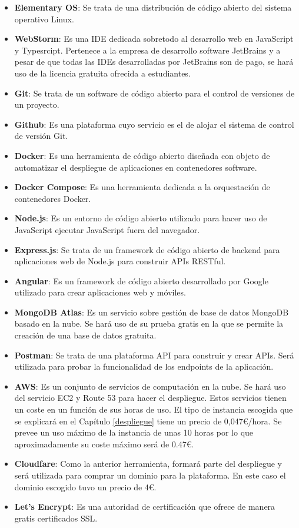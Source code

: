 \begin{itemize}
    \item \textbf{Elementary OS}: Se trata de una distribución de código abierto del sistema operativo Linux.
    \item \textbf{WebStorm}: Es una IDE dedicada sobretodo al desarrollo web en JavaScript y Typesrcipt. Pertenece a la empresa de desarrollo software JetBrains y a pesar de que todas las IDEs desarrolladas por JetBrains son de pago, se hará uso de la licencia gratuita ofrecida a estudiantes.
    \item \textbf{Git}: Se trata de un software de código abierto para el control de versiones de un proyecto.
    \item \textbf{Github}: Es una plataforma cuyo servicio es el de alojar el sistema de control de versión Git.
    \item \textbf{Docker}: Es una herramienta de código abierto diseñada con objeto de automatizar el despliegue de aplicaciones en contenedores software.
    \item \textbf{Docker Compose}: Es una herramienta dedicada a la orquestación de contenedores Docker.
    \item \textbf{Node.js}: Es un entorno de código abierto utilizado para hacer uso de JavaScript ejecutar JavaScript fuera del navegador.
    \item \textbf{Express.js}: Se trata de un framework de código abierto de backend para aplicaciones web de Node.js para construir APIs RESTful.
    \item \textbf{Angular}: Es un framework de código abierto desarrollado por Google utilizado para crear aplicaciones web y móviles.
    \item \textbf{MongoDB Atlas}: Es un servicio sobre gestión de base de datos MongoDB basado en la nube. Se hará uso de su prueba gratis en la que se permite la creación de una base de datos gratuita. 
    \item \textbf{Postman}: Se trata de una plataforma API para construir y crear APIs. Será utilizada para probar la funcionalidad de los endpoints de la aplicación.
    \item \textbf{AWS}: Es un conjunto de servicios de computación en la nube. Se hará uso del servicio EC2 y Route 53 para hacer el despliegue. Estos servicios tienen un coste en un función de sus horas de uso. El tipo de instancia escogida que se explicará en el Capítulo \ref{despliegue} tiene un precio de 0,047€/hora. Se prevee un uso máximo de la instancia de unas 10 horas por lo que aproximadamente su coste máximo será de 0.47€.
    \item \textbf{Cloudfare}: Como la anterior herramienta, formará parte del despliegue y será utilizada para comprar un dominio para la plataforma. En este caso el dominio escogido tuvo un precio de 4€.
    \item \textbf{Let's Encrypt}: Es una autoridad de certificación que ofrece de manera gratis certificados SSL.
\end{itemize}

